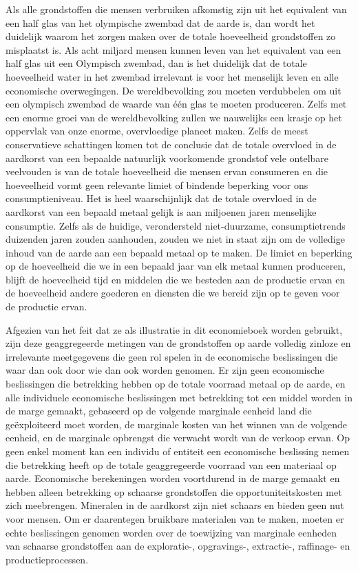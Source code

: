 Als alle grondstoffen die mensen verbruiken afkomstig zijn uit het
equivalent van een half glas van het olympische zwembad dat de aarde is,
dan wordt het duidelijk waarom het zorgen maken over de totale
hoeveelheid grondstoffen zo misplaatst is. Als acht miljard mensen
kunnen leven van het equivalent van een half glas uit een Olympisch
zwembad, dan is het duidelijk dat de totale hoeveelheid water in het
zwembad irrelevant is voor het menselijk leven en alle economische
overwegingen. De wereldbevolking zou moeten verdubbelen om uit een
olympisch zwembad de waarde van één glas te moeten produceren. Zelfs met
een enorme groei van de wereldbevolking zullen we nauwelijks een krasje
op het oppervlak van onze enorme, overvloedige planeet maken. Zelfs de
meest conservatieve schattingen komen tot de conclusie dat de totale
overvloed in de aardkorst van een bepaalde natuurlijk voorkomende
grondstof vele ontelbare veelvouden is van de totale hoeveelheid die
mensen ervan consumeren en die hoeveelheid vormt geen relevante limiet
of bindende beperking voor ons consumptieniveau. Het is heel
waarschijnlijk dat de totale overvloed in de aardkorst van een bepaald
metaal gelijk is aan miljoenen jaren menselijke consumptie. Zelfs als de
huidige, verondersteld niet-duurzame, consumptietrends duizenden jaren
zouden aanhouden, zouden we niet in staat zijn om de volledige inhoud
van de aarde aan een bepaald metaal op te maken. De limiet en beperking
op de hoeveelheid die we in een bepaald jaar van elk metaal kunnen
produceren, blijft de hoeveelheid tijd en middelen die we besteden aan
de productie ervan en de hoeveelheid andere goederen en diensten die we
bereid zijn op te geven voor de productie ervan.

Afgezien van het feit dat ze als illustratie in dit economieboek worden
gebruikt, zijn deze geaggregeerde metingen van de grondstoffen op aarde
volledig zinloze en irrelevante meetgegevens die geen rol spelen in de
economische beslissingen die waar dan ook door wie dan ook worden
genomen. Er zijn geen economische beslissingen die betrekking hebben op
de totale voorraad metaal op de aarde, en alle individuele economische
beslissingen met betrekking tot een middel worden in de marge gemaakt,
gebaseerd op de volgende marginale eenheid land die geëxploiteerd moet
worden, de marginale kosten van het winnen van de volgende eenheid, en
de marginale opbrengst die verwacht wordt van de verkoop ervan. Op geen
enkel moment kan een individu of entiteit een economische beslissing
nemen die betrekking heeft op de totale geaggregeerde voorraad van een
materiaal op aarde. Economische berekeningen worden voortdurend in de
marge gemaakt en hebben alleen betrekking op schaarse grondstoffen die
opportuniteitskosten met zich meebrengen. Mineralen in de aardkorst zijn
niet schaars en bieden geen nut voor mensen. Om er daarentegen bruikbare
materialen van te maken, moeten er echte beslissingen genomen worden
over de toewijzing van marginale eenheden van schaarse grondstoffen aan
de exploratie-, opgravings-, extractie-, raffinage- en
productieprocessen.


